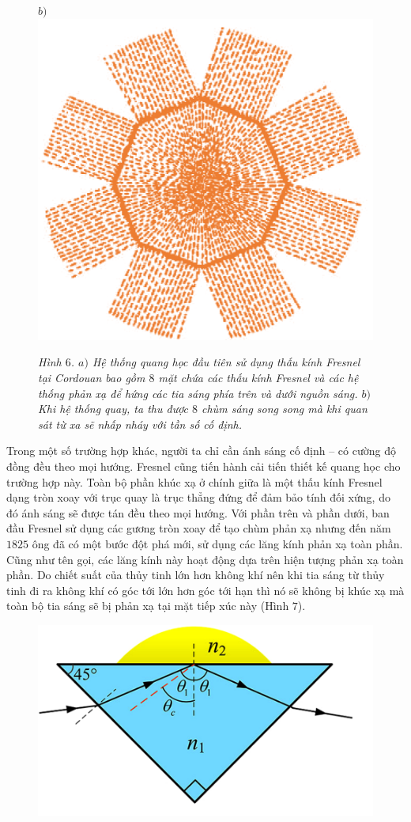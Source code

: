 \begin{multicols}{2}
\begin{figure}[H]
		$b)$\includegraphics[width= 0.43\linewidth]{7b}
		\caption{\small\textit{\color{timhieukhoahoc}Hình $6$. $a)$ Hệ thống quang học đầu tiên sử dụng thấu kính Fresnel tại Cordouan bao gồm $8$ mặt chứa các thấu kính Fresnel và các hệ thống phản xạ để hứng các tia sáng phía trên và dưới nguồn sáng. $b)$ Khi hệ thống quay, ta thu được $8$ chùm sáng song song mà khi quan sát từ xa sẽ nhấp nháy với tần số cố định.}}
		\vspace*{-10pt}
	\end{figure}
	Trong một số trường hợp khác, người ta chỉ cần ánh sáng cố định -- có cường độ đồng đều theo mọi hướng. Fresnel cũng tiến hành cải tiến thiết kế quang học cho trường hợp này. Toàn bộ phần khúc xạ ở chính giữa là một thấu kính Fresnel dạng tròn xoay với trục quay là trục thẳng đứng để đảm bảo tính đối xứng, do đó ánh sáng sẽ được tán đều theo mọi hướng. Với phần trên và phần dưới, ban đầu Fresnel sử dụng các gương tròn xoay để tạo chùm phản xạ nhưng đến năm $1825$ ông đã có một bước đột phá mới, sử dụng các lăng kính phản xạ toàn phần. 
	\vskip 0.1cm
	Cũng như tên gọi, các lăng kính này hoạt động dựa trên hiện tượng phản xạ toàn phần. Do chiết suất của thủy tinh lớn hơn không khí nên khi tia sáng từ thủy tinh đi ra không khí có góc tới lớn hơn góc tới hạn thì nó sẽ không bị khúc xạ mà toàn bộ tia sáng sẽ bị phản xạ tại mặt tiếp xúc này (Hình $7$).
	\begin{figure}[H]
		\vspace*{-5pt}
		\centering
		\captionsetup{labelformat= empty, justification=centering}
		\includegraphics[width= 1\linewidth]{8}

\end{figure}
\end{multicols}
